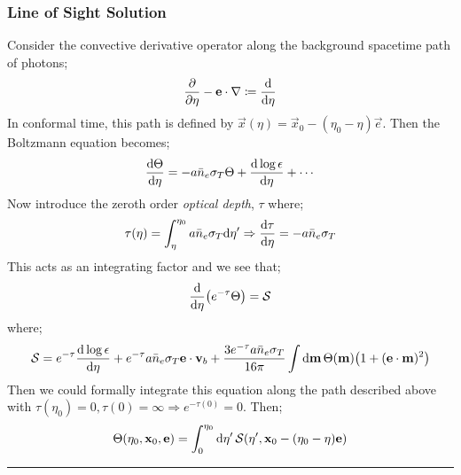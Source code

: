 \subsubsection{Line of Sight Solution}
Consider the convective derivative operator along the background spacetime path of photons;
\begin{equation}
\frac{\partial}{\partial \eta} - \mathbf{e}\cdot\nabla \coloneqq \frac{\text{d}}{\text{d} \eta}
\end{equation}
In conformal time, this path is defined by $\vec{x}(\eta) = \vec{x}_0 - (\eta_0 - \eta)\vec{e}$. Then the Boltzmann equation becomes;
\begin{equation*}
\frac{\text{d} \Theta}{\text{d} \eta} = -a\bar{n}_e \sigma_T \Theta + \frac{\text{d} \log \epsilon}{\text{d} \eta} + \cdots
\end{equation*} 
Now introduce the zeroth order \emph{optical depth}, $\tau$ where;
\begin{equation}
\tau(\eta) = \int_\eta^{\eta_0}{a\bar{n}_e\sigma_T \text{d} \eta^{\prime}} \Rightarrow \frac{\text{d} \tau}{\text{d} \eta} = -a\bar{n}_e \sigma_T
\end{equation}
This acts as an integrating factor and we see that;
\begin{equation*}
\frac{\ud}{\ud \eta}\left(e^{-\tau}\Theta\right) = \mathcal{S}
\end{equation*}
where;
\begin{equation*}
\mathcal{S} = e^{-\tau}\frac{\ud \log \epsilon}{\ud \eta} + e^{-\tau}a\bar{n}_e \sigma_T \vec{e}\cdot\vec{v}_b + \frac{3e^{-\tau}a\bar{n}_e\sigma_T}{16\pi}\int{\upd{\vec{m}}\Theta(\vec{m})\left(1 + (\vec{e}\cdot\vec{m})^2\right)}
\end{equation*}
Then we could formally integrate this equation along the path described above with $\tau(\eta_0) = 0, \tau(0) = \infty \Rightarrow e^{-\tau(0)} = 0$. Then;
\begin{equation}
\Theta(\eta_0, \vec{x}_0, \vec{e}) = \int_0^{\eta_0}{\upd{\eta\pr}\mathcal{S}\left(\eta\pr, \vec{x}_0 - (\eta_0 - \eta)\vec{e}\right)}
\end{equation}
\hrule
